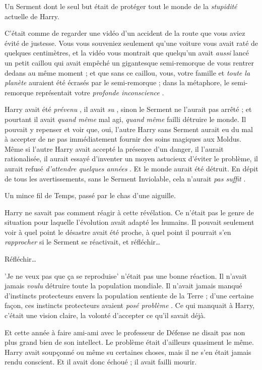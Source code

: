 Un Serment dont le seul but était de protéger tout le monde de la \emph{stupidité}  actuelle de Harry.

C'était comme de regarder une vidéo d'un accident de la route que vous aviez évité de justesse. Vous vous souveniez seulement qu'une voiture vous avait raté de quelques centimètres, et la vidéo vous montrait que quelqu'un avait \emph{aussi}  lancé un petit caillou qui avait empêché un gigantesque semi-remorque de vous rentrer dedans au même moment ; et que sans ce caillou, vous, votre famille et \emph{toute la planète}  auraient été écrasés par le semi-remorque ; dans la métaphore, le semi-remorque représentait votre \emph{profonde inconscience} .

Harry avait été \emph{prévenu} , il avait \emph{su} , sinon le Serment ne l'aurait pas arrêté ; et pourtant il avait \emph{quand même}  mal agi, \emph{quand même}  failli détruire le monde. Il pouvait y repenser et voir que, oui, l'autre Harry sans Serment aurait eu du mal à accepter de ne pas immédiatement fournir des soins magiques aux Moldus. Même si l'autre Harry avait accepté la présence d'un danger, il l'aurait rationalisée, il aurait essayé d'inventer un moyen astucieux d'éviter le problème, il aurait refusé \emph{d'attendre quelques années} . Et le monde aurait été détruit. En dépit de tous les avertissements, sans le Serment Inviolable, cela n'aurait \emph{pas suffit} .

Un mince fil de Temps, passé par le chas d'une aiguille.

Harry ne savait pas comment réagir à cette révélation. Ce n'était pas le genre de situation pour laquelle l'évolution avait adapté les humains. Il pouvait seulement voir à quel point le désastre avait été proche, à quel point il pourrait s'en \emph{rapprocher}  si le Serment se réactivait, et réfléchir…

Réfléchir…

'Je ne veux pas que ça se reproduise' n'était pas une bonne réaction. Il n'avait jamais \emph{voulu}  détruire toute la population mondiale. Il n'avait jamais manqué d'instincts protecteurs envers la population sentiente de la Terre ; d'une certaine façon, ces instincts protecteurs avaient \emph{posé problème} . Ce qui manquait à Harry, c'était une vision claire, la volonté d'accepter ce qu'il savait déjà.

Et cette année à faire ami-ami avec le professeur de Défense ne disait pas non plus grand bien de son intellect. Le problème était d'ailleurs quasiment le même. Harry avait soupçonné ou même su certaines choses, mais il ne s'en était jamais rendu conscient. Et il avait donc échoué ; il avait failli mourir.

